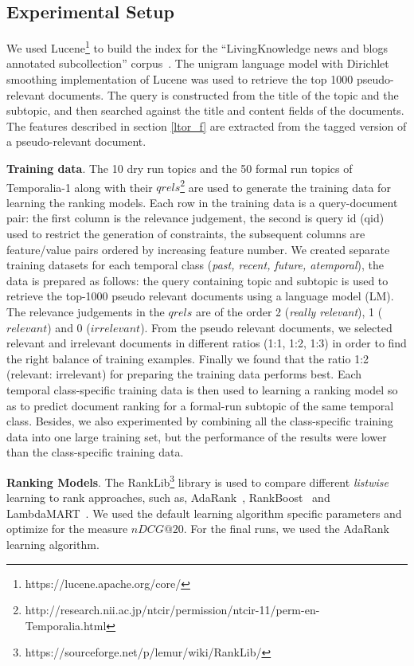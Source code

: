 \documentclass{sig-alternate}
\begin{document}
\subsection{Experimental Setup}
\label{setup}
We used Lucene\footnote{https://lucene.apache.org/core/} to build the index for the ``LivingKnowledge news and blogs annotated subcollection'' corpus~\cite{mioverview}. The unigram language model with Dirichlet smoothing implementation of Lucene was used to retrieve the top 1000 pseudo-relevant documents. The query is constructed from the title of the topic and the subtopic, and then searched against the title and content fields of the documents. The features described in section \ref{ltor_f} are extracted from the tagged version of a pseudo-relevant document.

\textbf{Training data}. The 10 dry run topics and the 50 formal run topics of Temporalia-1 along with their $qrels$\footnote{http://research.nii.ac.jp/ntcir/permission/ntcir-11/perm-en-Temporalia.html} are used to generate the training data for learning the ranking models. Each row in the training data is a query-document pair: the first column is the relevance judgement, the second is query id (qid) used to restrict the generation of constraints, the subsequent columns are feature/value pairs ordered by increasing feature number. We created separate training datasets for each temporal class (\textit{past, recent, future, atemporal}), the data is prepared as follows: the query containing topic and subtopic is used to retrieve the top-1000 pseudo relevant documents using a language model (LM). The relevance judgements in the $qrels$ are of the order 2 (\textit{really relevant}), 1 ($relevant$) and 0 ($irrelevant$). From the pseudo relevant documents, we selected relevant and irrelevant documents in different ratios (1:1, 1:2, 1:3) in order to find the right balance of training examples. Finally we found that the ratio 1:2 (relevant: irrelevant) for preparing the training data performs best. Each temporal class-specific training data is then used to learning a ranking model so as to predict document ranking for a formal-run subtopic of the same temporal class. Besides, we also experimented by combining all the class-specific training data into one large training set, but the performance of the results were lower than the class-specific training data.

\textbf{Ranking Models}. The RankLib\footnote{https://sourceforge.net/p/lemur/wiki/RankLib/} library is used to compare different \textit{listwise} learning to rank approaches, such as, AdaRank~\cite{adarank}, RankBoost~\cite{rankboost} and LambdaMART~\cite{lambdamart}. We used the default learning algorithm specific parameters and optimize for the measure $nDCG@20$. For the final runs, we used the AdaRank learning algorithm.
\end{document}
